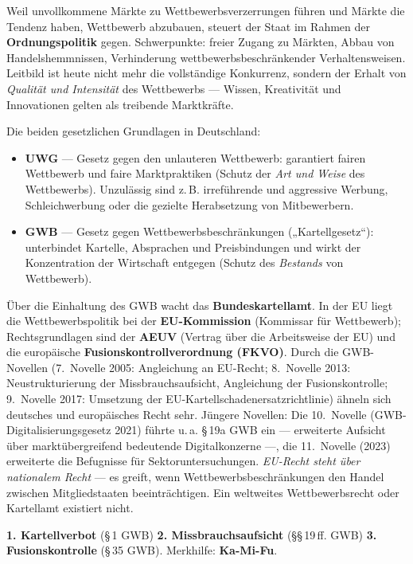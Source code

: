 \documentclass[11pt, a4paper]{article}
\begin{document}
Weil unvollkommene Märkte zu Wettbewerbsverzerrungen führen und Märkte die Tendenz haben,
Wettbewerb abzubauen, steuert der Staat im Rahmen der \textbf{Ordnungspolitik} gegen.
Schwerpunkte: freier Zugang zu Märkten, Abbau von Handelshemmnissen, Verhinderung
wettbewerbsbeschränkender Verhaltensweisen. Leitbild ist heute nicht mehr die
vollständige Konkurrenz, sondern der Erhalt von \emph{Qualität und Intensität} des
Wettbewerbs --- Wissen, Kreativität und Innovationen gelten als treibende Marktkräfte.

Die beiden gesetzlichen Grundlagen in Deutschland:

\begin{itemize}
  \item \textbf{UWG} --- Gesetz gegen den unlauteren Wettbewerb: garantiert fairen
    Wettbewerb und faire Marktpraktiken (Schutz der \emph{Art und Weise} des Wettbewerbs).
    Unzulässig sind z.\,B. irreführende und aggressive Werbung, Schleichwerbung oder die
    gezielte Herabsetzung von Mitbewerbern.
  \item \textbf{GWB} --- Gesetz gegen Wettbewerbsbeschränkungen („Kartellgesetz``):
    unterbindet Kartelle, Absprachen und Preisbindungen und wirkt der Konzentration der
    Wirtschaft entgegen (Schutz des \emph{Bestands} von Wettbewerb).
\end{itemize}

Über die Einhaltung des GWB wacht das \textbf{Bundeskartellamt}. In der EU liegt die
Wettbewerbspolitik bei der \textbf{EU-Kommission} (Kommissar für Wettbewerb);
Rechtsgrundlagen sind der \textbf{AEUV} (Vertrag über die Arbeitsweise der EU) und die
europäische \textbf{Fusionskontrollverordnung (FKVO)}. Durch die GWB-Novellen (7.~Novelle
2005: Angleichung an EU-Recht; 8.~Novelle 2013: Neustrukturierung der Missbrauchsaufsicht,
Angleichung der Fusionskontrolle; 9.~Novelle 2017: Umsetzung der
EU-Kartellschadenersatzrichtlinie) ähneln sich deutsches und europäisches Recht sehr.
Jüngere Novellen: Die 10.~Novelle (GWB-Digitalisierungsgesetz 2021) führte u.\,a.
\S\,19a GWB ein --- erweiterte Aufsicht über marktübergreifend bedeutende
Digitalkonzerne ---, die 11.~Novelle (2023) erweiterte die Befugnisse für
Sektoruntersuchungen.
\emph{EU-Recht steht über nationalem Recht} --- es greift, wenn Wettbewerbsbeschränkungen
den Handel zwischen Mitgliedstaaten beeinträchtigen. Ein weltweites Wettbewerbsrecht oder
Kartellamt existiert nicht.

\begin{merksatz}[title={\bfseries Die drei Säulen des GWB}]
\textbf{1. Kartellverbot} (\S\,1 GWB) \quad \textbf{2. Missbrauchsaufsicht}
(\S\S\,19\,ff. GWB) \quad \textbf{3. Fusionskontrolle} (\S\,35 GWB).
Merkhilfe: \textbf{Ka-Mi-Fu}.
\end{merksatz}
\end{document}
